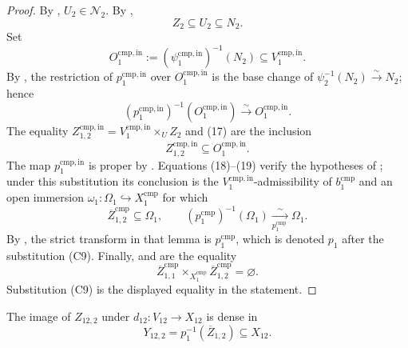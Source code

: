\begin{proof}
  By ,
  $U_2\in\mathscr N_2$.  By ,
  \[
    Z_2\subseteq U_2\subseteq N_2.                                \tag{17}
  \]
  Set
  \[
    O_1^{\mathrm{cmp,in}}
      :=(\psi_1^{\mathrm{cmp,in}})^{-1}(N_2)
      \subseteq V_1^{\mathrm{cmp,in}}.
  \]
  By
  , the restriction of
  $p_1^{\mathrm{cmp,in}}$ over $O_1^{\mathrm{cmp,in}}$ is the base change of
  $\psi_2^{-1}(N_2)\xrightarrow{\sim}N_2$; hence
  \[
    (p_1^{\mathrm{cmp,in}})^{-1}(O_1^{\mathrm{cmp,in}})
      \xrightarrow{\sim}O_1^{\mathrm{cmp,in}}.                    \tag{18}
  \]
  The equality
  $Z_{1,2}^{\mathrm{cmp,in}}=V_1^{\mathrm{cmp,in}}\times_UZ_2$
  and (17) are the inclusion
  \[
    Z_{1,2}^{\mathrm{cmp,in}}\subseteq O_1^{\mathrm{cmp,in}}.     \tag{19}
  \]
  The map $p_1^{\mathrm{cmp,in}}$ is proper by
  .  Equations (18)--(19)
  verify the hypotheses of
  ; under this substitution its
  conclusion is the $V_1^{\mathrm{cmp,in}}$-admissibility of
  $b_1^{\mathrm{cmp}}$ and an open immersion
  $\omega_1\colon\Omega_1\hookrightarrow X_1^{\mathrm{cmp}}$ for which
  \[
    \overline Z_{1,2}^{\mathrm{cmp}}\subseteq\Omega_1,
    \qquad
    (p_1^{\mathrm{cmp}})^{-1}(\Omega_1)
      \xrightarrow[ p_1^{\mathrm{cmp}}\ ]{\sim}\Omega_1.        \tag{19a}
  \]
  By , the strict transform
  in that lemma is $p_1^{\mathrm{cmp}}$, which is denoted $p_1$ after the
  substitution (C9).  Finally,
   and
   are the equality
  \[
    \overline Z_{1,1}^{\mathrm{cmp}}
      \times_{X_1^{\mathrm{cmp}}}
    \overline Z_{1,2}^{\mathrm{cmp}}=\varnothing.
  \]
  Substitution (C9) is the displayed equality in the statement.
\end{proof}

\begin{lemma}
  \label{lemma:nagata-comparison-boundary-density}
  \lean{}

  The image of $Z_{12,2}$ under $d_{12}\colon V_{12}\to X_{12}$ is dense in
  \[
    Y_{12,2}=p_1^{-1}(\overline Z_{1,2})\subseteq X_{12}.
  \]
\end{lemma}

